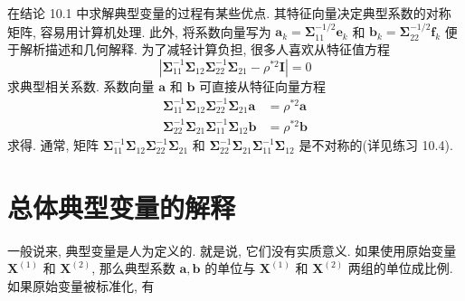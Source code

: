 在结论 10.1 中求解典型变量的过程有某些优点. 其特征向量决定典型系数的对称矩阵, 容易用计算机处理. 此外, 将系数向量写为 $\mathbf{a}_k=\boldsymbol{\Sigma}_{11}^{-1/2}\mathbf{e}_k$ 和 $\mathbf{b}_k=\boldsymbol{\Sigma}_{22}^{-1/2}\mathbf{f}_k$ 便于解析描述和几何解释. 为了减轻计算负担, 很多人喜欢从特征值方程
\label{eq:10-10}
\begin{equation}
|\boldsymbol{\Sigma}_{11}^{-1}\boldsymbol{\Sigma}_{12}\boldsymbol{\Sigma}_{22}^{-1}\boldsymbol{\Sigma}_{21}-\rho^{*2}\mathbf{I}|=0
\tag{10-10}
\end{equation}
求典型相关系数. 系数向量 $\mathbf{a}$ 和 $\mathbf{b}$ 可直接从特征向量方程
\label{eq:10-11}
\begin{equation}
\begin{aligned}
\boldsymbol{\Sigma}_{11}^{-1}\boldsymbol{\Sigma}_{12}\boldsymbol{\Sigma}_{22}^{-1}\boldsymbol{\Sigma}_{21}\mathbf{a}&=\rho^{*2}\mathbf{a}\\
\boldsymbol{\Sigma}_{22}^{-1}\boldsymbol{\Sigma}_{21}\boldsymbol{\Sigma}_{11}^{-1}\boldsymbol{\Sigma}_{12}\mathbf{b}&=\rho^{*2}\mathbf{b}
\end{aligned}
\tag{10-11}
\end{equation}
求得. 通常, 矩阵 $\boldsymbol{\Sigma}_{11}^{-1}\boldsymbol{\Sigma}_{12}\boldsymbol{\Sigma}_{22}^{-1}\boldsymbol{\Sigma}_{21}$ 和 $\boldsymbol{\Sigma}_{22}^{-1}\boldsymbol{\Sigma}_{21}\boldsymbol{\Sigma}_{11}^{-1}\boldsymbol{\Sigma}_{12}$ 是不对称的(详见练习 10.4).

\section{总体典型变量的解释}
\label{sec:10.3}

一般说来, 典型变量是人为定义的. 就是说, 它们没有实质意义. 如果使用原始变量 $\mathbf{X}^{(1)}$ 和 $\mathbf{X}^{(2)}$, 那么典型系数 $\mathbf{a},\mathbf{b}$ 的单位与 $\mathbf{X}^{(1)}$ 和 $\mathbf{X}^{(2)}$ 两组的单位成比例. 如果原始变量被标准化, 有
